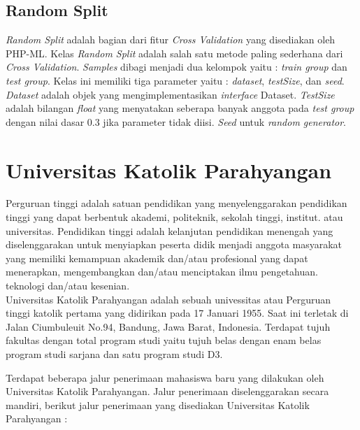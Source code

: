 \subsection{Random Split}
\textit{Random Split} adalah bagian dari fitur \textit{Cross Validation} yang disediakan oleh PHP-ML. Kelas \textit{Random Split} adalah salah satu metode paling sederhana dari \textit{Cross Validation}. \textit{Samples} dibagi menjadi dua kelompok yaitu : \textit{train group} dan \textit{test group}. Kelas ini memiliki tiga parameter yaitu : \textit{dataset}, \textit{testSize}, dan \textit{seed}. \textit{Dataset} adalah objek yang mengimplementasikan \textit{interface} Dataset. \textit{TestSize} adalah bilangan \textit{float} yang menyatakan seberapa banyak anggota pada \textit{test group} dengan nilai dasar 0.3 jika parameter tidak diisi. \textit{Seed} untuk \textit{random generator}.

\section{Universitas Katolik Parahyangan}

Perguruan tinggi adalah satuan pendidikan yang menyelenggarakan pendidikan tinggi yang dapat berbentuk akademi, politeknik, sekolah tinggi, institut. atau universitas. Pendidikan tinggi adalah kelanjutan pendidikan menengah yang diselenggarakan untuk menyiapkan peserta didik menjadi anggota masyarakat yang memiliki kemampuan akademik dan/atau profesional yang dapat menerapkan, mengembangkan dan/atau menciptakan ilmu pengetahuan. teknologi dan/atau kesenian. \\ %

Universitas Katolik Parahyangan adalah sebuah univessitas atau Perguruan tinggi katolik pertama yang didirikan pada 17 Januari 1955. Saat ini terletak di Jalan Ciumbuleuit No.94, Bandung, Jawa Barat, Indonesia. Terdapat tujuh fakultas dengan total program studi yaitu tujuh belas dengan enam belas program studi sarjana dan satu program studi D3. %

Terdapat beberapa jalur penerimaan mahasiswa baru yang dilakukan oleh Universitas Katolik Parahyangan. Jalur penerimaan diselenggarakan secara mandiri, berikut jalur penerimaan yang disediakan Universitas Katolik Parahyangan :

